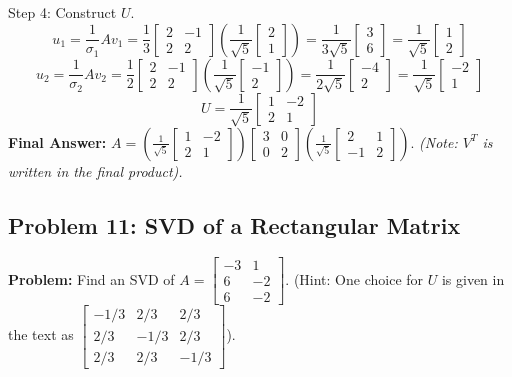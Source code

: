 \documentclass[11pt, letterpaper]{article}
\theoremstyle{definition}
\theoremstyle{remark}
\begin{document}
Step 4: Construct $U$.
\[
u_1 = \frac{1}{\sigma_1} A v_1 = \frac{1}{3} \begin{bmatrix} 2 & -1 \\ 2 & 2 \end{bmatrix} \left( \frac{1}{\sqrt{5}} \begin{bmatrix} 2 \\ 1 \end{bmatrix} \right) = \frac{1}{3\sqrt{5}} \begin{bmatrix} 3 \\ 6 \end{bmatrix} = \frac{1}{\sqrt{5}} \begin{bmatrix} 1 \\ 2 \end{bmatrix}
\]
\[
u_2 = \frac{1}{\sigma_2} A v_2 = \frac{1}{2} \begin{bmatrix} 2 & -1 \\ 2 & 2 \end{bmatrix} \left( \frac{1}{\sqrt{5}} \begin{bmatrix} -1 \\ 2 \end{bmatrix} \right) = \frac{1}{2\sqrt{5}} \begin{bmatrix} -4 \\ 2 \end{bmatrix} = \frac{1}{\sqrt{5}} \begin{bmatrix} -2 \\ 1 \end{bmatrix}
\]
\[
U = \frac{1}{\sqrt{5}} \begin{bmatrix} 1 & -2 \\ 2 & 1 \end{bmatrix}
\]
\textbf{Final Answer:} $A = \left( \frac{1}{\sqrt{5}} \begin{bmatrix} 1 & -2 \\ 2 & 1 \end{bmatrix} \right) \begin{bmatrix} 3 & 0 \\ 0 & 2 \end{bmatrix} \left( \frac{1}{\sqrt{5}} \begin{bmatrix} 2 & 1 \\ -1 & 2 \end{bmatrix} \right)$. \textit{(Note: $V^T$ is written in the final product).}

\vspace{1em}
\subsection{Problem 11: SVD of a Rectangular Matrix}
\textbf{Problem:} Find an SVD of $A = \begin{bmatrix} -3 & 1 \\ 6 & -2 \\ 6 & -2 \end{bmatrix}$. (Hint: One choice for $U$ is given in the text as $\begin{bmatrix} -1/3 & 2/3 & 2/3 \\ 2/3 & -1/3 & 2/3 \\ 2/3 & 2/3 & -1/3 \end{bmatrix}$).
\end{document}
